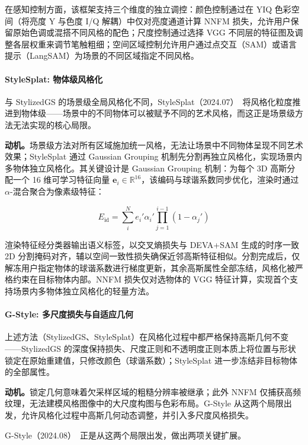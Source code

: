 在感知控制方面，该框架支持三个维度的独立调控：颜色控制通过在 YIQ 色彩空间（将亮度 Y 与色度 I/Q 解耦）中仅对亮度通道计算 NNFM 损失，允许用户保留原始色调或混搭不同风格的配色；尺度控制通过选择 VGG 不同层的特征图及调整各层权重来调节笔触粗细；空间区域控制允许用户通过点交互（SAM）或语言提示（LangSAM）为场景的不同区域指定不同风格。

\paragraph{StyleSplat: 物体级风格化}

与 StylizedGS 的场景级全局风格化不同，StyleSplat（2024.07）~\cite{2407_09473}将风格化粒度推进到物体级——场景中的不同物体可以被赋予不同的艺术风格，而这正是场景级方法无法实现的核心局限。

\textbf{动机。}场景级方法对所有区域施加统一风格，无法让场景中不同物体呈现不同艺术效果；StyleSplat 通过 Gaussian Grouping 机制先分割再独立风格化，实现场景内多物体独立风格化。其关键设计是 Gaussian Grouping 机制：为每个 3D 高斯分配一个 16 维可学习特征向量 $\mathbf{e}_i \in \mathbb{R}^{16}$，该编码与球谐系数同步优化，渲染时通过 $\alpha$-混合聚合为像素级特征：

\begin{equation}
E_{\text{id}} = \sum_{i}^{N} e_i' \alpha_i' \prod_{j=1}^{i-1}(1-\alpha_j')
\end{equation}

渲染特征经分类器输出语义标签，以交叉熵损失与 DEVA+SAM 生成的时序一致 2D 分割掩码对齐，辅以空间一致性损失确保近邻高斯特征相似。分割完成后，仅解冻用户指定物体的球谐系数进行梯度更新，其余高斯属性全部冻结，风格化被严格约束在目标物体内部。NNFM 损失仅对选物体的 VGG 特征计算，实现首个支持场景内多物体独立风格化的轻量方法。

\paragraph{G-Style: 多尺度损失与自适应几何}

上述方法（StylizedGS、StyleSplat）在风格化过程中都严格保持高斯几何不变——StylizedGS 的深度保持损失、尺度正则和不透明度正则本质上将位置与形状锁定在原始重建值，只修改颜色（球谐系数）；StyleSplat 进一步冻结非目标物体的全部属性。

\textbf{动机。}锁定几何意味着欠采样区域的粗糙分辨率被继承；此外 NNFM 仅捕获高频纹理，无法建模风格图像中的大尺度构图与色彩布局。G-Style 从这两个局限出发，允许风格化过程中高斯几何动态调整，并引入多尺度风格损失。

G-Style（2024.08）~\cite{2408_15695}正是从这两个局限出发，做出两项关键扩展。

